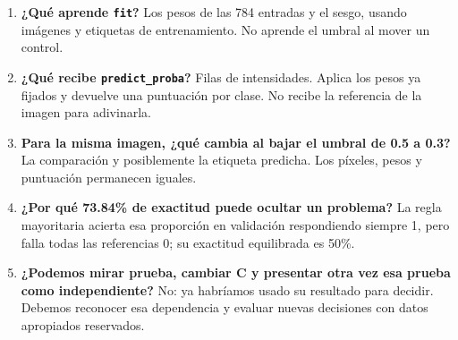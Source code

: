 \begin{enumerate}
\item \textbf{¿Qué aprende \texttt{\small fit}?} Los pesos de las 784 entradas y el sesgo, usando imágenes y etiquetas de entrenamiento. No aprende el umbral al mover un control.
\item \textbf{¿Qué recibe \texttt{\small predict\_\allowbreak{}proba}?} Filas de intensidades. Aplica los pesos ya fijados y devuelve una puntuación por clase. No recibe la referencia de la imagen para adivinarla.
\item \textbf{Para la misma imagen, ¿qué cambia al bajar el umbral de 0.5 a 0.3?} La comparación y posiblemente la etiqueta predicha. Los píxeles, pesos y puntuación permanecen iguales.
\item \textbf{¿Por qué 73.84\% de exactitud puede ocultar un problema?} La regla mayoritaria acierta esa proporción en validación respondiendo siempre 1, pero falla todas las referencias 0; su exactitud equilibrada es 50\%.
\item \textbf{¿Podemos mirar prueba, cambiar C y presentar otra vez esa prueba como independiente?} No: ya habríamos usado su resultado para decidir. Debemos reconocer esa dependencia y evaluar nuevas decisiones con datos apropiados reservados.
\end{enumerate}


